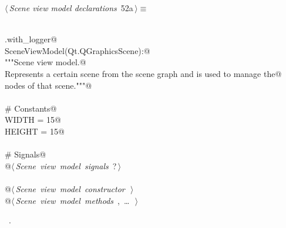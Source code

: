 \documentclass[
    a4paper,      %
    10pt,         %
    openright,    %
    notitlepage,  %
    parskip=half, %
]{scrreprt}       %
\theoremstyle{definition}                    %
\begin{document}
\begin{flushleft} \small
\begin{minipage}{\linewidth}\label{scrap80}\raggedright\small
{} $\langle\,${\itshape Scene view model declarations}\nobreak\ {\footnotesize {52a}}$\,\rangle\equiv$
\vspace{-1ex}
\begin{list}{}{} \item
\mbox{}\lstinline@@\\
\mbox{}\lstinline@common.with_logger@\\
\mbox{}\lstinline@class SceneViewModel(Qt.QGraphicsScene):@\\
\mbox{}\lstinline@    """Scene view model.@\\
\mbox{}\lstinline@    Represents a certain scene from the scene graph and is used to manage the@\\
\mbox{}\lstinline@    nodes of that scene."""@\\
\mbox{}\lstinline@@\\
\mbox{}\lstinline@    # Constants@\\
\mbox{}\lstinline@    WIDTH = 15@\\
\mbox{}\lstinline@    HEIGHT = 15@\\
\mbox{}\lstinline@@\\
\mbox{}\lstinline@    # Signals@\\
\mbox{}\lstinline@    @\hbox{$\langle\,${\itshape Scene view model signals}\nobreak\ {\footnotesize ?}$\,\rangle$}\lstinline@@\\
\mbox{}\lstinline@@\\
\mbox{}\lstinline@    @\hbox{$\langle\,${\itshape Scene view model constructor}\nobreak\ {\footnotesize {}}$\,\rangle$}\lstinline@@\\
\mbox{}\lstinline@    @\hbox{$\langle\,${\itshape Scene view model methods}\nobreak\ {\footnotesize {}, \ldots\ }$\,\rangle$}\lstinline@@\\
\mbox{}\lstinline@@{\NWsep}
\end{list}
\vspace{-1.5ex}
\footnotesize
\begin{list}{}{\setlength{\itemsep}{-\parsep}\setlength{\itemindent}{-\leftmargin}}
\item \NWtxtMacroRefIn\ .

\item{}
\end{list}
\end{minipage}\vspace{4ex}
\end{flushleft}
\end{document}
